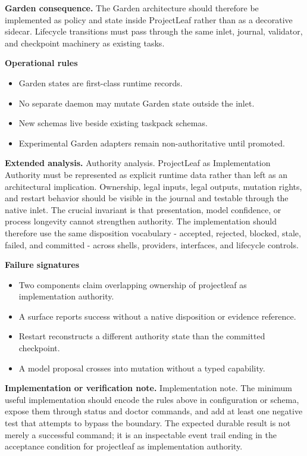 \documentclass[10pt,letterpaper,oneside]{article}
\begin{document}
\textbf{Garden consequence.} The Garden architecture should therefore be implemented as policy and state inside ProjectLeaf rather than as a decorative sidecar. Lifecycle transitions must pass through the same inlet, journal, validator, and checkpoint machinery as existing tasks.

\textbf{Operational rules}
\begin{itemize}
\item Garden states are first-class runtime records.
\item No separate daemon may mutate Garden state outside the inlet.
\item New schemas live beside existing taskpack schemas.
\item Experimental Garden adapters remain non-authoritative until promoted.
\end{itemize}
\textbf{Extended analysis.} Authority analysis. ProjectLeaf as Implementation Authority must be represented as explicit runtime data rather than left as an architectural implication. Ownership, legal inputs, legal outputs, mutation rights, and restart behavior should be visible in the journal and testable through the native inlet. The crucial invariant is that presentation, model confidence, or process longevity cannot strengthen authority. The implementation should therefore use the same disposition vocabulary - accepted, rejected, blocked, stale, failed, and committed - across shells, providers, interfaces, and lifecycle controls.

\textbf{Failure signatures}
\begin{itemize}
\item Two components claim overlapping ownership of projectleaf as implementation authority.
\item A surface reports success without a native disposition or evidence reference.
\item Restart reconstructs a different authority state than the committed checkpoint.
\item A model proposal crosses into mutation without a typed capability.
\end{itemize}
\textbf{Implementation or verification note.} Implementation note. The minimum useful implementation should encode the rules above in configuration or schema, expose them through status and doctor commands, and add at least one negative test that attempts to bypass the boundary. The expected durable result is not merely a successful command; it is an inspectable event trail ending in the acceptance condition for projectleaf as implementation authority.
\end{document}
